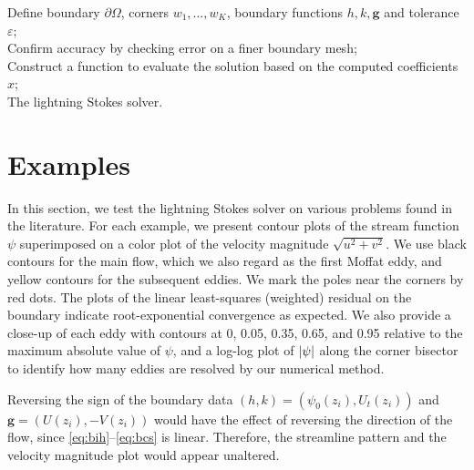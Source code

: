 \documentclass{article}
\newcounter{example}[section]
\renewcommand{\vec}[1]{\mathbf{#1}}
\begin{document}
\begin{algorithm}[H]
	\SetAlgoLined
   Define boundary $\partial \Omega$, corners $w_1,\ldots,w_K$, boundary
   functions $h,k,\vec{g}$ and tolerance $\varepsilon$;\\
	Confirm accuracy by checking error on a finer boundary mesh;\\
	Construct a function to evaluate the solution based on the computed coefficients $x$;\\
	\caption{The lightning Stokes solver.}
\end{algorithm}

\section{Examples \label{sec:results}}

In this section, we test the lightning Stokes solver on various problems found
in the literature. For each example, we present contour plots of the stream
function $\psi$ superimposed on a color plot of the velocity magnitude
$\sqrt{u^2+v^2}$. We use black contours for the main flow, which we also regard
as the first Moffat eddy, and yellow contours for the subsequent eddies. We
mark the poles near the corners by red dots. The plots of the linear
least-squares (weighted) residual on the boundary indicate root-exponential
convergence as expected. We also provide a close-up of each eddy with contours
at 0, 0.05, 0.35, 0.65, and 0.95 relative to the maximum absolute value of
$\psi$, and a log-log plot of $\abs{\psi}$ along the corner bisector to
identify how many eddies are resolved by our numerical method.

Reversing the sign of the boundary data $(h,k)=(\psi_0(z_i), U_t(z_i))$ and
$\vec{g}=(U(z_i), -V(z_i))$ would have the effect of reversing the direction of
the flow, since \eqref{eq:bih}--\eqref{eq:bcs} is linear. Therefore, the
streamline pattern and the velocity magnitude plot would appear unaltered.
\end{document}
